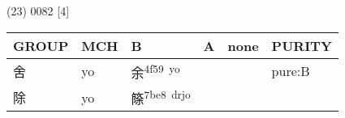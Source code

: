 \documentclass[14pt,a4paper]{scrartcl}
\begin{document}
(23) 0082 {[}4{]}

\begin{longtable}[c]{@{}llllll@{}}
\toprule
\begin{minipage}[b]{0.14\columnwidth}\raggedright\strut
GROUP
\strut\end{minipage} &
\begin{minipage}[b]{0.14\columnwidth}\raggedright\strut
MCH
\strut\end{minipage} &
\begin{minipage}[b]{0.14\columnwidth}\raggedright\strut
B
\strut\end{minipage} &
\begin{minipage}[b]{0.14\columnwidth}\raggedright\strut
A
\strut\end{minipage} &
\begin{minipage}[b]{0.14\columnwidth}\raggedright\strut
none
\strut\end{minipage} &
\begin{minipage}[b]{0.14\columnwidth}\raggedright\strut
PURITY
\strut\end{minipage}\tabularnewline
\midrule
\endhead
\begin{minipage}[t]{0.14\columnwidth}\raggedright\strut
舍
\strut\end{minipage} &
\begin{minipage}[t]{0.14\columnwidth}\raggedright\strut
yo
\strut\end{minipage} &
\begin{minipage}[t]{0.14\columnwidth}\raggedright\strut
余\textsuperscript{4f59~yo}
\strut\end{minipage} &
\begin{minipage}[t]{0.14\columnwidth}\raggedright\strut
\strut\end{minipage} &
\begin{minipage}[t]{0.14\columnwidth}\raggedright\strut
\strut\end{minipage} &
\begin{minipage}[t]{0.14\columnwidth}\raggedright\strut
pure:B
\strut\end{minipage}\tabularnewline
\begin{minipage}[t]{0.14\columnwidth}\raggedright\strut
除
\strut\end{minipage} &
\begin{minipage}[t]{0.14\columnwidth}\raggedright\strut
yo
\strut\end{minipage} &
\begin{minipage}[t]{0.14\columnwidth}\raggedright\strut
篨\textsuperscript{7be8~drjo}

\end{minipage}
\end{longtable}
\end{document}
